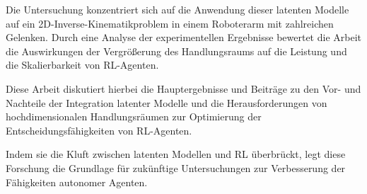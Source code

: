 Die Untersuchung konzentriert sich auf die Anwendung dieser latenten Modelle auf ein 2D-Inverse-Kinematikproblem in einem Roboterarm mit zahlreichen Gelenken. Durch eine Analyse der experimentellen Ergebnisse bewertet die Arbeit die Auswirkungen der Vergrößerung des Handlungsraums auf die Leistung und die Skalierbarkeit von RL-Agenten.

Diese Arbeit diskutiert hierbei die Hauptergebnisse und Beiträge zu den Vor- und Nachteile der Integration latenter Modelle und die Herausforderungen von hochdimensionalen Handlungsräumen zur Optimierung der Entscheidungsfähigkeiten von RL-Agenten.


Indem sie die Kluft zwischen latenten Modellen und RL überbrückt, legt diese Forschung die Grundlage für zukünftige Untersuchungen zur Verbesserung der Fähigkeiten autonomer Agenten.